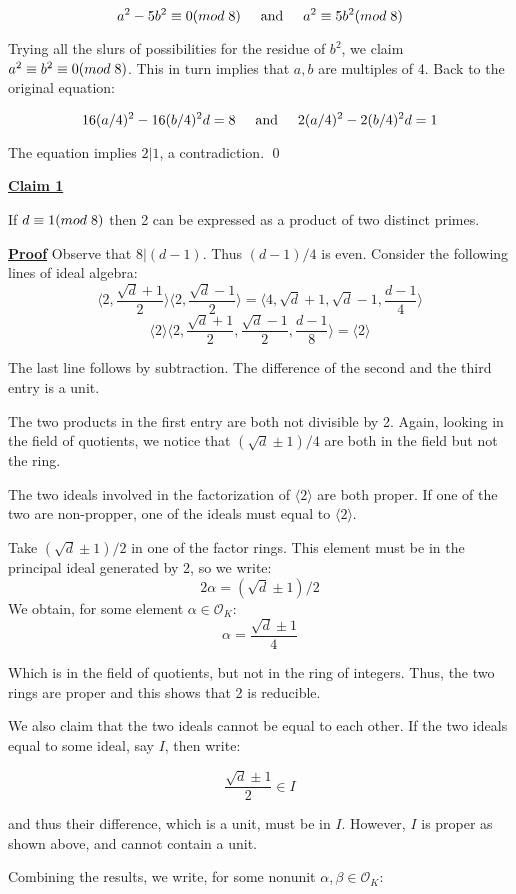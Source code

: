 \documentclass{article}
\newcommand{\new}[1]{
    \vspace{2mm}
    \noindent
    \textbf{
    \underline{#1}}
}
\def\_{{\hspace{1mm}}}
\def\contradiction{{\lightning}}
\newcommand{\Proof}{{
    \vspace{2mm}
    \noindent
    \textbf{
    \underline{Proof}}
}
}
\newcommand{\textAnd}{
    \hspace{5mm}
    \textrm{and}
    \hspace{5mm}
}
\newcommand{\<}{{{
    \langle
}}}
\def\>{{{
    \rangle
}}}
\newcommand{\ringInt}{
    {\mathcal{O}}
}
\begin{document}
\[
    a^2-5b^2 \equiv 0 (mod\_8)
    \textAnd
    a^2 \equiv 5b^2 (mod\_8)
\]

Trying all the slurs of possibilities for the residue of $b^2$, 
we claim $a^2 \equiv b^2 \equiv 0 (mod\_8)$. This in turn implies 
that $a, b$ are multiples of 4. Back to the original equation:


\[
    16(a/4)^2-16(b/4)^2d = 8
    \textAnd
    2(a/4)^2-2(b/4)^2d=1
\]

The equation implies $2|1$, a contradiction. \contradiction \qed

\new{Claim 1}
If $d \equiv 1 (mod\_8)$ then 2 can be expressed as 
a product of two distinct primes. 

\Proof Observe that $8|(d-1)$. Thus $(d-1)/4$ is even. Consider 
the following lines of ideal algebra:
\[
    \big\langle2, \frac{\sqrt{d}+1}{2}\big\rangle
\big\langle2, \frac{\sqrt{d}-1}{2}\big\rangle
=
\big\langle4, \sqrt{d}+1, \sqrt{d}-1, \frac{d-1}{4}\big\rangle
\]
\[
    \<2\>\big\langle2, \frac{\sqrt{d}+1}{2}, \frac{\sqrt{d}-1}{2}, \frac{d-1}{8}\big\rangle
=\<2\>
    \]

The last line follows by subtraction. The difference of 
the second and the third entry is a unit. 

The two products in the first entry are both not divisible by 2. 
Again, looking in the field of quotients, we notice that 
$(\sqrt{d}\pm 1)/4$ are both in the field but not the ring. 

The two ideals involved in the factorization of $\<2\>$ are both 
proper. If one of the two are non-propper, one of the 
ideals must equal to $\<2\>$. 

Take 
$(\sqrt{d}\pm1)/2$ in one of the factor rings.
This element must be in the principal ideal generated by 2, so 
we write:
\[
    2\alpha = (\sqrt{d}\pm1)/2
\]
We obtain, for some element 
$\alpha \in \ringInt_K$:
\[
    \alpha = \frac{\sqrt{d}\pm 1}{4}
\]

Which is in the field of quotients, but not in the ring of integers. 
Thus, the two rings are proper and this shows that 2 is reducible. 

We also claim that the two ideals cannot be equal to each other. 
If the two ideals equal to some ideal, say $I$, then write:

\[
    \frac{\sqrt{d}\pm1}{2} \in I
\]

and thus their difference, which is a unit, must be in $I$. 
However, $I$ is proper as shown above, and cannot contain a unit. 

Combining the results, we write, for some nonunit $\alpha, \beta \in 
\ringInt_K$:
\end{document}
